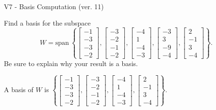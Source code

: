\begin{exercise}
  \begin{exerciseTitle}V7 - Basis Computation (ver. 11)\end{exerciseTitle}
  \begin{exerciseStatement}
    Find a basis for the subspace 
\[W=\mathrm{span}\ \left\{\left[\begin{array}{r}
-1 \\
-3 \\
-3 \\
-2
\end{array}\right] , \left[\begin{array}{r}
-3 \\
-2 \\
-1 \\
-2
\end{array}\right] , \left[\begin{array}{r}
-4 \\
1 \\
-4 \\
-3
\end{array}\right] , \left[\begin{array}{r}
-3 \\
3 \\
-9 \\
-4
\end{array}\right] , \left[\begin{array}{r}
2 \\
-1 \\
3 \\
-4
\end{array}\right]\right\}.\]
 Be sure to explain why your result is a basis.


  \end{exerciseStatement}
  \begin{exerciseAnswer}
   A basis of \(W\) is  \(\left\{\left[\begin{array}{r}
-1 \\
-3 \\
-3 \\
-2
\end{array}\right] , \left[\begin{array}{r}
-3 \\
-2 \\
-1 \\
-2
\end{array}\right] , \left[\begin{array}{r}
-4 \\
1 \\
-4 \\
-3
\end{array}\right] , \left[\begin{array}{r}
2 \\
-1 \\
3 \\
-4
\end{array}\right]\right\}\).
  


  \end{exerciseAnswer}
\end{exercise}